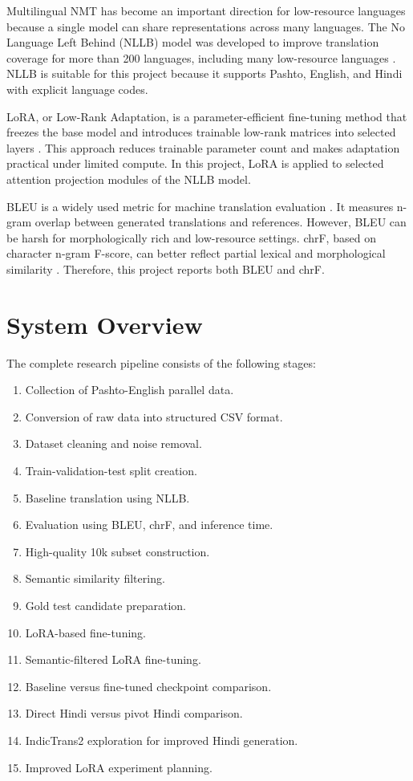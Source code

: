 \documentclass[conference]{IEEEtran}
\begin{document}
Multilingual NMT has become an important direction for low-resource languages because a single model can share representations across many languages. The No Language Left Behind (NLLB) model was developed to improve translation coverage for more than 200 languages, including many low-resource languages \cite{nllb}. NLLB is suitable for this project because it supports Pashto, English, and Hindi with explicit language codes.

LoRA, or Low-Rank Adaptation, is a parameter-efficient fine-tuning method that freezes the base model and introduces trainable low-rank matrices into selected layers \cite{lora}. This approach reduces trainable parameter count and makes adaptation practical under limited compute. In this project, LoRA is applied to selected attention projection modules of the NLLB model.

BLEU is a widely used metric for machine translation evaluation \cite{bleu}. It measures n-gram overlap between generated translations and references. However, BLEU can be harsh for morphologically rich and low-resource settings. chrF, based on character n-gram F-score, can better reflect partial lexical and morphological similarity \cite{chrf}. Therefore, this project reports both BLEU and chrF.

\section{System Overview}

The complete research pipeline consists of the following stages:

\begin{enumerate}
    \item Collection of Pashto-English parallel data.
    \item Conversion of raw data into structured CSV format.
    \item Dataset cleaning and noise removal.
    \item Train-validation-test split creation.
    \item Baseline translation using NLLB.
    \item Evaluation using BLEU, chrF, and inference time.
    \item High-quality 10k subset construction.
    \item Semantic similarity filtering.
    \item Gold test candidate preparation.
    \item LoRA-based fine-tuning.
    \item Semantic-filtered LoRA fine-tuning.
    \item Baseline versus fine-tuned checkpoint comparison.
    \item Direct Hindi versus pivot Hindi comparison.
    \item IndicTrans2 exploration for improved Hindi generation.
    \item Improved LoRA experiment planning.
\end{enumerate}
\end{document}
